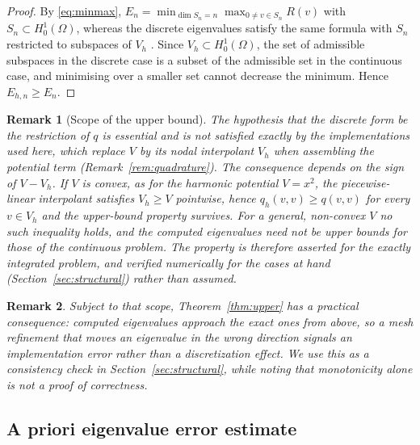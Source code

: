 \documentclass[pdflatex,sn-mathphys-num]{sn-jnl}
\theoremstyle{thmstyleone}%
\theoremstyle{thmstyletwo}%
\newtheorem{remark}{Remark}%
\theoremstyle{thmstylethree}%
\begin{document}
\begin{proof}
By \eqref{eq:minmax}, $E_n = \min_{\dim S_n = n} \max_{0\neq v\in S_n} R(v)$
with $S_n \subset H^1_0(\Omega)$, whereas the discrete eigenvalues satisfy the
same formula with $S_n$ restricted to subspaces of $V_h$
\cite{courant1953,babuska1991,boffi2010}. Since
$V_h \subset H^1_0(\Omega)$, the set of admissible subspaces in the discrete
case is a subset of the admissible set in the continuous case, and minimising
over a smaller set cannot decrease the minimum. Hence $E_{h,n} \geq E_n$.
\end{proof}

\begin{remark}[Scope of the upper bound]\label{rem:upperscope}
The hypothesis that the discrete form be the restriction of $q$ is essential and
is \emph{not} satisfied exactly by the implementations used here, which replace
$V$ by its nodal interpolant $V_h$ when assembling the potential term
(Remark~\ref{rem:quadrature}). The consequence depends on the sign of
$V - V_h$. If $V$ is convex, as for the harmonic potential $V = x^2$, the
piecewise-linear interpolant satisfies $V_h \geq V$ pointwise, hence
$q_h(v,v) \geq q(v,v)$ for every $v \in V_h$ and the upper-bound property
survives. For a general, non-convex $V$ no such inequality holds, and the
computed eigenvalues need not be upper bounds for those of the continuous
problem. The property is therefore asserted for the exactly integrated problem,
and \emph{verified numerically} for the cases at hand
(Section~\ref{sec:structural}) rather than assumed.
\end{remark}

\begin{remark}
Subject to that scope, Theorem~\ref{thm:upper} has a practical consequence:
computed eigenvalues approach the exact ones from above, so a mesh refinement
that moves an eigenvalue in the wrong direction signals an implementation error
rather than a discretization effect. We use this as a consistency check in
Section~\ref{sec:structural}, while noting that monotonicity alone is not a proof
of correctness.
\end{remark}

\subsection{A priori eigenvalue error estimate}
\end{document}
